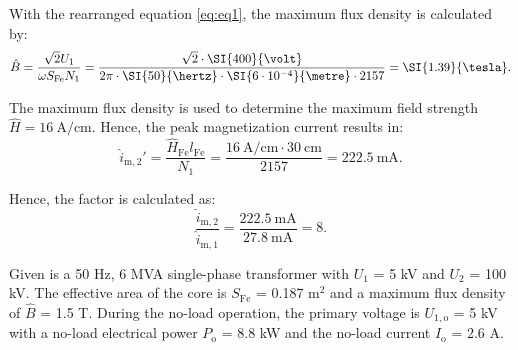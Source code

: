 
\begin{solutionblock}
  With the rearranged equation \eqref{eq:eq1}, the maximum flux density is calculated by:
  \begin{equation}
    \hat{B} = \frac{\sqrt{2} U_{\mathrm{1}}}{\omega S_{\mathrm{Fe}} N_{\mathrm{1}}}
    = \frac{\sqrt{2} \cdot \SI{400}{\volt}}{2\pi \cdot \SI{50}{\hertz} \cdot \SI{6 \cdot 10^{-4}}{\metre} \cdot 2157}
    = \SI{1.39}{\tesla}.
  \end{equation}

  The maximum flux density is used to determine the maximum field strength $\hat{H} = \SI{16}{\ampere \per \centi \metre}$. Hence, the peak magnetization current results in:
  \begin{equation}
    \hat{i}_{\mathrm{m,2}}' = \frac{\hat{H}_{\mathrm{Fe}} l_{\mathrm{Fe}}}{N_{\mathrm{1}}}
    = \frac{\SI{16}{\ampere \per \centi \metre} \cdot \SI{30}{\centi \metre}}{2157}
    = \SI{222.5}{\milli\ampere}.
  \end{equation}

  Hence, the factor is calculated as:
  \begin{equation}
    \frac{\hat{i}_{\mathrm{m,2}}}{\hat{i}_{\mathrm{m,1}}} = \frac{\SI{222.5}{\milli\ampere}}{\SI{27.8}{\milli\ampere}}
    = 8.
  \end{equation}
\end{solutionblock}




Given is a 50 Hz, 6 MVA single-phase transformer with $U_{\mathrm{1}}$ = 5 kV and $U_{\mathrm{2}}$ = 100 kV.
The effective area of the core is $S_{\mathrm{Fe}}$ = 0.187 $\mathrm{m}^2$ and a maximum flux density of $\hat{B}$ = 1.5 T. During the no-load operation, the primary voltage is $U_{\mathrm{1,o}}$ = 5 kV with a no-load electrical power $P_{\mathrm{o}}$ = 8.8 kW and the no-load current $I_{\mathrm{o}}$ = 2.6 A.




